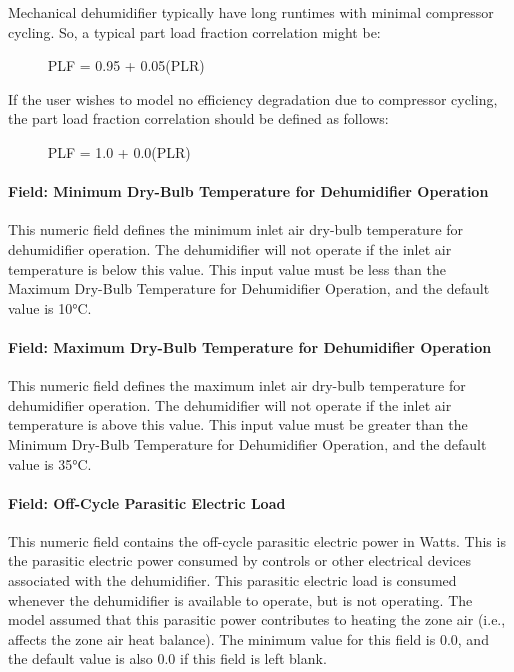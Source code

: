 Mechanical dehumidifier typically have long runtimes with minimal compressor cycling. So, a typical part load fraction correlation might be:

~~~~~ PLF = 0.95 + 0.05(PLR)

If the user wishes to model no efficiency degradation due to compressor cycling, the part load fraction correlation should be defined as follows:

~~~~~ PLF = 1.0 + 0.0(PLR)

\paragraph{Field: Minimum Dry-Bulb Temperature for Dehumidifier Operation}\label{field-minimum-dry-bulb-temperature-for-dehumidifier-operation}

This numeric field defines the minimum inlet air dry-bulb temperature for dehumidifier operation. The dehumidifier will not operate if the inlet air temperature is below this value. This input value must be less than the Maximum Dry-Bulb Temperature for Dehumidifier Operation, and the default value is 10°\si{C}.

\paragraph{Field: Maximum Dry-Bulb Temperature for Dehumidifier Operation}\label{field-maximum-dry-bulb-temperature-for-dehumidifier-operation}

This numeric field defines the maximum inlet air dry-bulb temperature for dehumidifier operation. The dehumidifier will not operate if the inlet air temperature is above this value. This input value must be greater than the Minimum Dry-Bulb Temperature for Dehumidifier Operation, and the default value is 35°\si{C}.

\paragraph{Field: Off-Cycle Parasitic Electric Load}\label{field-off-cycle-parasitic-electric-load-001}

This numeric field contains the off-cycle parasitic electric power in Watts. This is the parasitic electric power consumed by controls or other electrical devices associated with the dehumidifier. This parasitic electric load is consumed whenever the dehumidifier is available to operate, but is not operating. The model assumed that this parasitic power contributes to heating the zone air (i.e., affects the zone air heat balance). The minimum value for this field is 0.0, and the default value is also 0.0 if this field is left blank.

